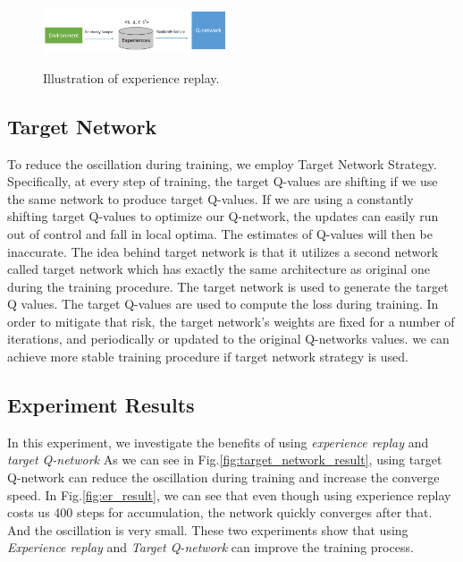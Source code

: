 \begin{figure}[ht!]
	\centering
	\includegraphics[width=0.49\textwidth]{./fig/experience_replay.png} \\
	\caption{Illustration of experience replay.}
	\label{fig:experience_replay}
\end{figure}

\subsection{Target Network}
To reduce the oscillation during training, we employ Target Network Strategy\cite{lillicrap2015continuous}.
%
Specifically, at every step of training, the target Q-values are shifting if we use the same network to produce target Q-values.
%
If we are using a constantly shifting target Q-values to optimize our Q-network, the updates can easily run out of control and fall in local optima. The estimates of Q-values will then be inaccurate.
%
The idea behind target network is that it utilizes a second network called target network which has exactly the same architecture as original one during the training procedure.
%
The target network is used to generate the target Q values. The target Q-values are used to compute the loss during training.
%
In order to mitigate that risk, the target network’s weights are fixed for a number of iterations, and periodically or updated to the original Q-networks values. 
%
we can achieve more stable training procedure if target network strategy is used.

\subsection{Experiment Results}


In this experiment, we investigate the benefits of using \textit{experience replay} and \textit{target Q-network}
%
As we can see in Fig.\ref{fig:target_network_result}, using target Q-network can reduce the oscillation during training and increase the converge speed.
%
In Fig.\ref{fig:er_result}, we can see that even though using experience replay costs us 400 steps for accumulation, the network quickly converges after that. And the oscillation is very small.
%
These two experiments show that using \textit{Experience replay} and \textit{Target Q-network} can improve the training process.


